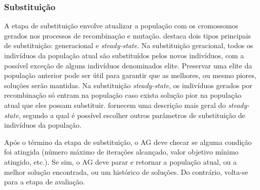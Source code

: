 \subsubsection{Substituição}

A etapa de substituição envolve atualizar a população com os cromossomos gerados nos processos de recombinação e mutação. \textcite{MASSAGO2013} destaca dois tipos principais de substituição: generacional e \emph{steady-state}. Na substituição geracional, todos os indivíduos da população atual são substituídos pelos novos indivíduos, com a possível exceção de alguns indivíduos denominados elite. Preservar uma elite da população anterior pode ser útil para garantir que as melhores, ou mesmo piores, soluções serão mantidas. Na substituição \emph{steady-state}, os indivíduos gerados por recombinação só entram na população caso exista solução pior na população atual que eles possam substituir. \textcite{SASTRY2005} fornecem uma descrição mais geral do \emph{steady-state}, segundo a qual é possível escolher outros parâmetros de substituição de indivíduos da população.

Após o término da etapa de substituição, o AG deve checar se alguma condição foi atingida (número máximo de iterações alcançado, valor objetivo mínimo atingido, etc.). Se sim, o AG deve parar e retornar a população atual, ou a melhor solução encontrada, ou um histórico de soluções. Do contrário, volta-se para a etapa de avaliação.
